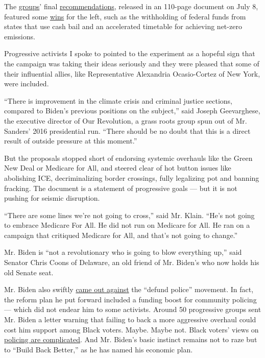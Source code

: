 The
\href{https://www.nytimes3xbfgragh.onion/aponline/2020/07/08/us/politics/ap-us-election-2020-biden.html}{groups}'
final
\href{https://joebiden.com/wp-content/uploads/2020/07/UNITY-TASK-FORCE-RECOMMENDATIONS.pdf}{recommendations},
released in an 110-page document on July 8, featured some
\href{https://www.politico.com/news/2020/07/08/biden-legal-marijuana-police-protections-353585?nname=playbook\&nid=0000014f-1646-d88f-a1cf-5f46b7bd0000\&nrid=00000163-9937-d365-aff3-fdbffcd70000\&nlid=630318}{wins}
for the left, such as the withholding of federal funds from states that
use cash bail and an accelerated timetable for achieving net-zero
emissions.

Progressive activists I spoke to pointed to the experiment as a hopeful
sign that the campaign was taking their ideas seriously and they were
pleased that some of their influential allies, like Representative
Alexandria Ocasio-Cortez of New York, were included.

``There is improvement in the climate crisis and criminal justice
sections, compared to Biden's previous positions on the subject,'' said
Joseph Geevarghese, the executive director of Our Revolution, a grass
roots group spun out of Mr. Sanders' 2016 presidential run. ``There
should be no doubt that this is a direct result of outside pressure at
this moment.''

But the proposals stopped short of endorsing systemic overhauls like the
Green New Deal or Medicare for All, and steered clear of hot button
issues like abolishing ICE, decriminalizing border crossings, fully
legalizing pot and banning fracking. The document is a statement of
progressive goals --- but it is not pushing for seismic disruption.

``There are some lines we're not going to cross,'' said Mr. Klain.
``He's not going to embrace Medicare For All. He did not run on Medicare
for All. He ran on a campaign that critiqued Medicare for All, and
that's not going to change.''

Mr. Biden is ``not a revolutionary who is going to blow everything up,''
said Senator Chris Coons of Delaware, an old friend of Mr. Biden's who
now holds his old Senate seat.

Mr. Biden also swiftly
\href{https://www.nytimes3xbfgragh.onion/2020/06/08/us/politics/biden-defund-the-police.html}{came
out against} the ``defund police'' movement. In fact, the reform plan he
put forward included a funding boost for community policing --- which
did not endear him to some activists. Around 50 progressive groups sent
Mr. Biden a letter warning that failing to back a more aggressive
overhaul could cost him support among Black voters. Maybe. Maybe not.
Black voters' views on
\href{https://www.vox.com/2020/6/17/21292046/black-people-abolish-defund-dismantle-police-george-floyd-breonna-taylor-black-lives-matter-protest}{policing
are complicated}. And Mr. Biden's basic instinct remains not to raze but
to ``Build Back Better,'' as he has named his economic plan.

